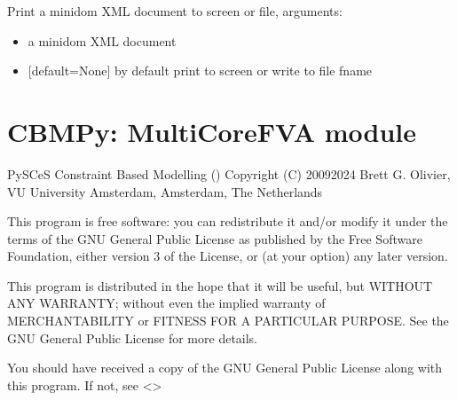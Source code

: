 \documentclass[letterpaper,10pt,english]{sphinxmanual}
\begin{document}
\begin{fulllineitems}
\label{\detokenize{modules_doc:cbmpy.CBXML.xml_viewSBML2FBAXML}}
\pysigstartsignatures
{}
\pysigstopsignatures
\sphinxAtStartPar
Print a minidom XML document to screen or file, arguments:
\begin{itemize}
\item {} 
\sphinxAtStartPar
{} a minidom XML document

\item {} 
\sphinxAtStartPar
{} {[}default=None{]} by default print to screen or write to file fname

\end{itemize}

\end{fulllineitems}

\label{\detokenize{modules_doc:module-cbmpy._multicorefva}}

\section{CBMPy: MultiCoreFVA module}
\label{\detokenize{modules_doc:cbmpy-multicorefva-module}}
\sphinxAtStartPar
PySCeS Constraint Based Modelling ()
Copyright (C) 2009\sphinxhyphen{}2024 Brett G. Olivier, VU University Amsterdam, Amsterdam, The Netherlands

\sphinxAtStartPar
This program is free software: you can redistribute it and/or modify
it under the terms of the GNU General Public License as published by
the Free Software Foundation, either version 3 of the License, or
(at your option) any later version.

\sphinxAtStartPar
This program is distributed in the hope that it will be useful,
but WITHOUT ANY WARRANTY; without even the implied warranty of
MERCHANTABILITY or FITNESS FOR A PARTICULAR PURPOSE.  See the
GNU General Public License for more details.

\sphinxAtStartPar
You should have received a copy of the GNU General Public License
along with this program.  If not, see \textless{}\textgreater{}
\end{document}
